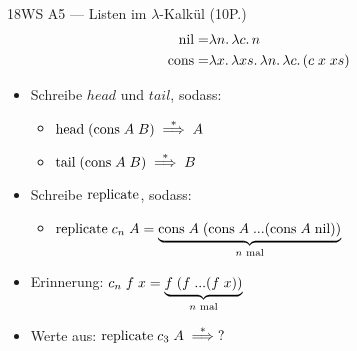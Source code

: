 \documentclass{beamer}
\begin{document}
\begin{frame}{18WS A5 --- Listen im $\lambda$-Kalkül (10P.)}
	\begin{eqnarray*}
		\text{nil}  =& \lambda n.\, \lambda c.\, n \\
                \text{cons} =& \lambda x.\, \lambda xs.\, \lambda n.\, \lambda c.\, (c\;x\;xs)
	\end{eqnarray*}

	\begin{itemize}
		\item Schreibe $head$ und $tail$, sodass:
		\begin{itemize}
                  \item $\text{head}\;(\text{cons}\;A\;B) \stackrel{*}{\implies} A$
                  \item $\text{tail}\;(\text{cons}\;A\;B) \stackrel{*}{\implies} B$
		\end{itemize}
		\pause
		\item Schreibe $\text{replicate}$, sodass:
		\begin{itemize}
                  \item $\text{replicate}\;c_{n}\;A = \underbrace{\text{cons}\;A\;(\text{cons}\;A\;... (\text{cons}\;A\;\text{nil}))}_\text{$n$ mal}$
		\end{itemize}
              \item Erinnerung: $c_{n}\;f\;x = \underbrace{f\;(f\;... (f\;x))}_\text{$n$ mal}$
		\pause
              \item Werte aus: $\text{replicate}\;c_{3}\;A \stackrel{*}{\implies} ?$
	\end{itemize}
\end{frame}
\end{document}
